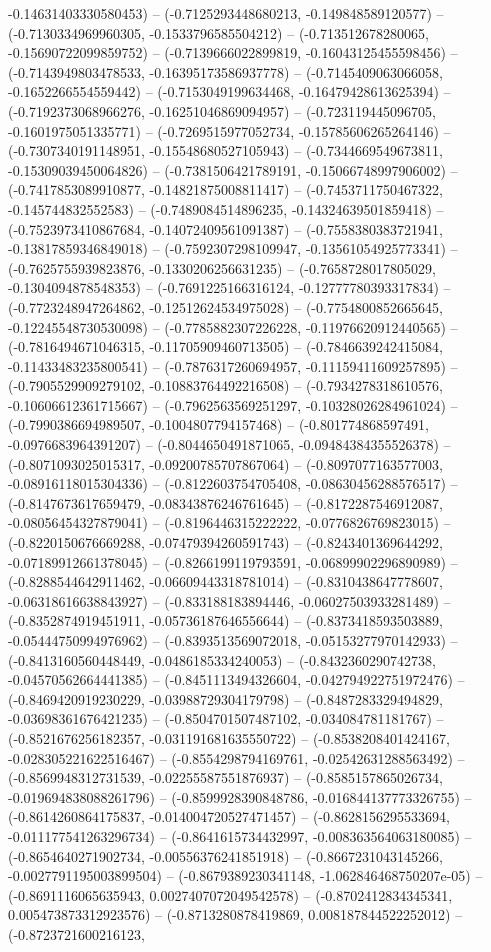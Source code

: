 -0.14631403330580453) -- (-0.7125293448680213, -0.149848589120577) -- (-0.7130334969960305, -0.1533796585504212) -- (-0.713512678280065, -0.15690722099859752) -- (-0.7139666022899819, -0.16043125455598456) -- (-0.7143949803478533, -0.16395173586937778) -- (-0.7145409063066058, -0.1652266554559442) -- (-0.7153049199634468, -0.16479428613625394) -- (-0.7192373068966276, -0.16251046869094957) -- (-0.723119445096705, -0.1601975051335771) -- (-0.7269515977052734, -0.15785606265264146) -- (-0.7307340191148951, -0.15548680527105943) -- (-0.7344669549673811, -0.15309039450064826) -- (-0.7381506421789191, -0.15066748997906002) -- (-0.7417853089910877, -0.14821875008811417) -- (-0.7453711750467322, -0.145744832552583) -- (-0.7489084514896235, -0.14324639501859418) -- (-0.7523973410867684, -0.14072409561091387) -- (-0.7558380383721941, -0.13817859346849018) -- (-0.7592307298109947, -0.13561054925773341) -- (-0.7625755939823876, -0.1330206256631235) -- (-0.7658728017805029, -0.1304094878548353) -- (-0.7691225166316124, -0.12777780393317834) -- (-0.7723248947264862, -0.12512624534975028) -- (-0.7754800852665645, -0.12245548730530098) -- (-0.7785882307226228, -0.11976620912440565) -- (-0.7816494671046315, -0.11705909460713505) -- (-0.7846639242415084, -0.11433483235800541) -- (-0.7876317260694957, -0.11159411609257895) -- (-0.7905529909279102, -0.10883764492216508) -- (-0.7934278318610576, -0.10606612361715667) -- (-0.7962563569251297, -0.10328026284961024) -- (-0.7990386694989507, -0.1004807794157468) -- (-0.801774868597491, -0.0976683964391207) -- (-0.8044650491871065, -0.09484384355526378) -- (-0.8071093025015317, -0.09200785707867064) -- (-0.8097077163577003, -0.08916118015304336) -- (-0.8122603754705408, -0.08630456288576517) -- (-0.8147673617659479, -0.08343876246761645) -- (-0.8172287546912087, -0.08056454327879041) -- (-0.8196446315222222, -0.0776826769823015) -- (-0.8220150676669288, -0.07479394260591743) -- (-0.8243401369644292, -0.07189912661378045) -- (-0.8266199119793591, -0.06899902296890989) -- (-0.8288544642911462, -0.06609443318781014) -- (-0.8310438647778607, -0.06318616638843927) -- (-0.833188183894446, -0.06027503933281489) -- (-0.8352874919451911, -0.05736187646556644) -- (-0.8373418593503889, -0.05444750994976962) -- (-0.8393513569072018, -0.05153277970142933) -- (-0.8413160560448449, -0.0486185334240053) -- (-0.8432360290742738, -0.04570562664441385) -- (-0.8451113494326604, -0.042794922751972476) -- (-0.8469420919230229, -0.03988729304179798) -- (-0.8487283329494829, -0.03698361676421235) -- (-0.8504701507487102, -0.034084781181767) -- (-0.8521676256182357, -0.031191681635550722) -- (-0.8538208401424167, -0.028305221622516467) -- (-0.8554298794169761, -0.02542631288563492) -- (-0.8569948312731539, -0.02255587551876937) -- (-0.8585157865026734, -0.019694838088261796) -- (-0.8599928390848786, -0.016844137773326755) -- (-0.8614260864175837, -0.014004720527471457) -- (-0.8628156295533694, -0.011177541263296734) -- (-0.8641615734432997, -0.008363564063180085) -- (-0.8654640271902734, -0.00556376241851918) -- (-0.8667231043145266, -0.0027791195003899504) -- (-0.8679389230341148, -1.062846468750207e-05) -- (-0.8691116065635943, 0.0027407072049542578) -- (-0.8702412834345341, 0.005473873312923576) -- (-0.8713280878419869, 0.008187844522252012) -- (-0.8723721600216123, 